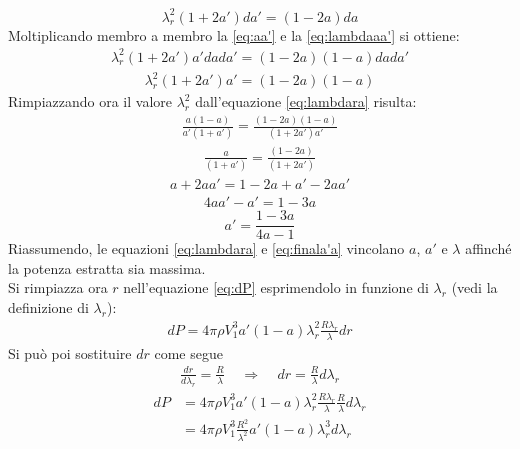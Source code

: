 \begin{equation}\label{eq:lambdaaa'}
\lambda_r^2 \left( 1+ 2a' \right) da' = \left( 1 - 2a \right)da
\end{equation}
Moltiplicando membro a membro la \ref{eq:aa'} e la \ref{eq:lambdaaa'} si ottiene:
\begin{align*}
\lambda_r^2 \left( 1 + 2a' \right) a' da da' = \left( 1 - 2a \right) \left( 1-a \right) da da'
\end{align*}
\begin{align*}
\lambda_r^2 \left( 1 + 2a' \right) a' = \left( 1- 2a \right) \left(1 -a \right)
\end{align*}
Rimpiazzando ora il valore $\lambda_r^2$ dall'equazione \ref{eq:lambdara} risulta:
\begin{align*}
\frac{a \left(1 - a \right)}{a' \left(1 + a' \right)} = \frac{\left( 1 - 2a \right) \left( 1 -a \right)}{\left(1 + 2a' \right) a'}
\end{align*}
\begin{align*}
\frac{a}{\left( 1 + a' \right)} = \frac{\left( 1 - 2a \right)}{\left( 1 + 2a' \right)}
\end{align*}
\begin{align*}
a + 2 a a' = 1 - 2a + a' - 2aa'
\end{align*}
\begin{align*}
4aa' -a' = 1 - 3a
\end{align*}
\begin{equation}\label{eq:finala'a}
\boxed{a' = \frac{1 - 3a}{4a -1}}
\end{equation}
Riassumendo, le equazioni \ref{eq:lambdara} e \ref{eq:finala'a} vincolano $a$, $a'$ e $\lambda$ affinché la potenza estratta sia massima.\\
Si rimpiazza ora $r$ nell'equazione \ref{eq:dP} esprimendolo in funzione di $\lambda_r$ (vedi la definizione di $\lambda_r$):
\begin{align*}
dP = 4 \pi \rho V_1^3 a' \left( 1 - a \right) \lambda_r^2 \frac{R \lambda_r}{\lambda} dr
\end{align*}
Si può poi sostituire $dr$ come segue
\begin{align*}
\frac{dr}{d \lambda_r} = \frac{R}{\lambda} \;\;\;\; \Rightarrow \;\;\;\; dr = \frac{R}{\lambda} d \lambda_r
\end{align*}
\begin{align*}
dP &= 4 \pi \rho V_1^3 a' \left(1 - a \right) \lambda_r^2 \frac{R \lambda_r}{\lambda} \frac{R}{\lambda} d \lambda_r\\
&= 4 \pi \rho V_1^3 \frac{R^2}{\lambda^2} a' \left( 1 - a \right) \lambda_r^3 d\lambda_r
\end{align*}
